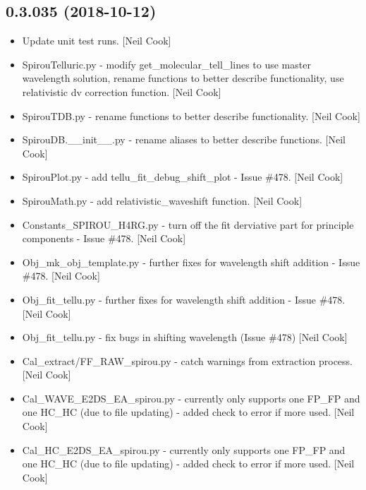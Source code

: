 \documentclass[a4paper,10pt,english]{report}
\begin{document}
\subsection{0.3.035 (2018-10-12)}
\label{\detokenize{misc/changelog:id295}}\begin{itemize}
\item {} 
Update unit test runs. {[}Neil Cook{]}

\item {} 
SpirouTelluric.py - modify get\_molecular\_tell\_lines to use master
wavelength solution, rename functions to better describe
functionality, use relativistic dv correction function. {[}Neil Cook{]}

\item {} 
SpirouTDB.py - rename functions to better describe functionality.
{[}Neil Cook{]}

\item {} 
SpirouDB.\_\_init\_\_.py - rename aliases to better describe functions.
{[}Neil Cook{]}

\item {} 
SpirouPlot.py - add tellu\_fit\_debug\_shift\_plot - Issue \#478. {[}Neil
Cook{]}

\item {} 
SpirouMath.py - add relativistic\_waveshift function. {[}Neil Cook{]}

\item {} 
Constants\_SPIROU\_H4RG.py - turn off the fit derviative part for
principle components - Issue \#478. {[}Neil Cook{]}

\item {} 
Obj\_mk\_obj\_template.py - further fixes for wavelength shift addition -
Issue \#478. {[}Neil Cook{]}

\item {} 
Obj\_fit\_tellu.py - further fixes for wavelength shift addition - Issue
\#478. {[}Neil Cook{]}

\item {} 
Obj\_fit\_tellu.py - fix bugs in shifting wavelength (Issue \#478) {[}Neil
Cook{]}

\item {} 
Cal\_extract/FF\_RAW\_spirou.py - catch warnings from extraction process.
{[}Neil Cook{]}

\item {} 
Cal\_WAVE\_E2DS\_EA\_spirou.py - currently only supports one FP\_FP and one
HC\_HC (due to file updating) - added check to error if more used.
{[}Neil Cook{]}

\item {} 
Cal\_HC\_E2DS\_EA\_spirou.py - currently only supports one FP\_FP and one
HC\_HC (due to file updating) - added check to error if more used.
{[}Neil Cook{]}


\end{itemize}
\end{document}
